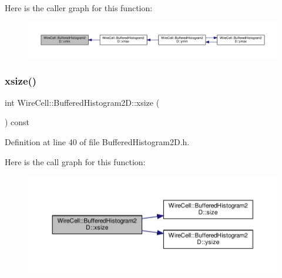 Here is the caller graph for this function\+:
\nopagebreak
\begin{figure}[H]
\begin{center}
\leavevmode
\includegraphics[width=350pt]{class_wire_cell_1_1_buffered_histogram2_d_a282c0f0144e547a7893760993461d4d7_icgraph}
\end{center}
\end{figure}
\mbox{\label{class_wire_cell_1_1_buffered_histogram2_d_a2ce3d1a3085fe45c039d65b00907d4a6}} 
\subsubsection{\texorpdfstring{xsize()}{xsize()}}
{\footnotesize\ttfamily int Wire\+Cell\+::\+Buffered\+Histogram2\+D\+::xsize (\begin{DoxyParamCaption}{ }\end{DoxyParamCaption}) const\hspace{0.3cm}{\ttfamily [inline]}}



Definition at line 40 of file Buffered\+Histogram2\+D.\+h.

Here is the call graph for this function\+:
\nopagebreak
\begin{figure}[H]
\begin{center}
\leavevmode
\includegraphics[width=350pt]{class_wire_cell_1_1_buffered_histogram2_d_a2ce3d1a3085fe45c039d65b00907d4a6_cgraph}
\end{center}
\end{figure}
\mbox{\label{class_wire_cell_1_1_buffered_histogram2_d_abb36fbf4ad399b56d7c72556e596a7c4}} 
